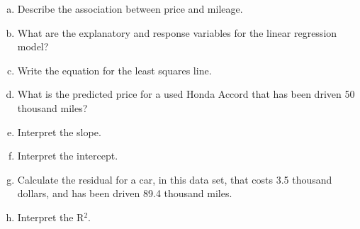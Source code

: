\documentclass[11pt]{article}\usepackage[]{graphicx}\usepackage[]{color}
\begin{document}
\begin{enumerate}[(a)]
\item Describe the association between price and mileage.\\
\vspace{0.75cm}

\item What are the explanatory and response variables for the linear regression model?\\
\vspace{1.5cm}

\item Write the equation for the least squares line.\\
\vspace{1.5cm}

\item What is the predicted price for a used Honda Accord that has been driven 50 thousand miles?\\ 
\vspace{1.5cm}

\item Interpret the slope.\\
\vspace{3cm}

\item Interpret the intercept.\\
\vspace{3cm}

\item Calculate the residual for a car, in this data set, that costs 3.5 thousand dollars, and has been driven 89.4 thousand miles.\\ 
\vspace{3cm}

\item Interpret the R$^2$.\\
\end{enumerate}
\end{document}
